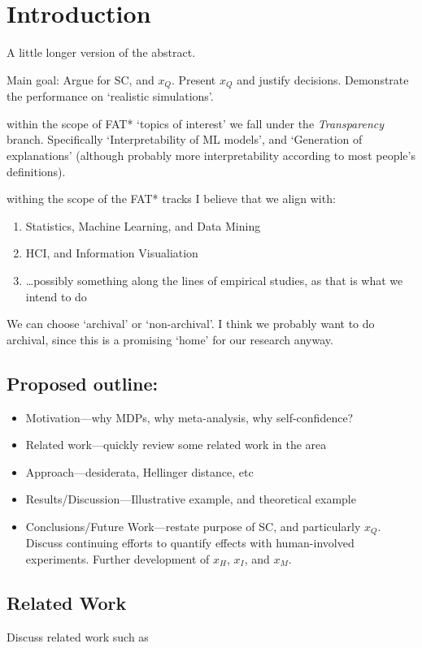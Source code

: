 \section{Introduction}
A little longer version of the abstract.

Main goal: Argue for SC, and $x_Q$. Present $x_Q$ and justify decisions. Demonstrate the performance on `realistic simulations'.

within the scope of FAT* `topics of interest' we fall under the \emph{Transparency} branch. Specifically `Interpretability of ML models', and `Generation of explanations' (although probably more interpretability according to most people's definitions).

withing the scope of the FAT* tracks I believe that we align with:

\begin{enumerate}
    \item Statistics, Machine Learning, and Data Mining
    \item HCI, and Information Visualiation
    \item \ldots possibly something along the lines of empirical studies, as that is what we intend to do
\end{enumerate}

We can choose `archival' or `non-archival'. I think we probably want to do archival, since this is a promising `home' for our research anyway.

\subsection{Proposed outline:}

\begin{itemize}
    \item Motivation---why MDPs, why meta-analysis, why self-confidence?
    \item Related work---quickly review some related work in the area
    \item Approach---desiderata, Hellinger distance, etc
    \item Results/Discussion---Illustrative example, and theoretical example
    \item Conclusions/Future Work---restate purpose of SC, and particularly $x_Q$. Discuss continuing efforts to quantify effects with human-involved experiments. Further development of $x_H$, $x_I$, and $x_M$.
\end{itemize}

\subsection{Related Work}
    Discuss related work such as

